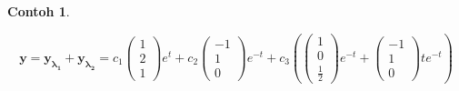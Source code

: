 \documentclass[a4paper]{article}
\theoremstyle{definisi}
\newtheorem{contoh}{Contoh}[section]
\numberwithin{equation}{section}
\begin{document}
\begin{contoh}
\begin{enumerate}[label=Langkah \arabic*: ,leftmargin=*]
\begin{equation*}
        \mathbf{y}=\mathbf{y_{\lambda_1}}+\mathbf{y_{\lambda_2}}=c_1\begin{pmatrix}
          1\\2\\1
        \end{pmatrix}e^t+c_2\begin{pmatrix}
          -1\\1\\0
        \end{pmatrix}e^{-t}+c_3\left(\begin{pmatrix}
          1\\0\\\frac{1}{2}
        \end{pmatrix}e^{-t}+\begin{pmatrix}
          -1\\1\\0
        \end{pmatrix}te^{-t}\right)
      \end{equation*}
    \end{enumerate}
  \end{contoh}
\end{document}
